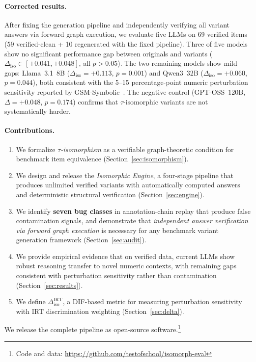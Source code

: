 \paragraph{Corrected results.}
After fixing the generation pipeline and independently verifying all
variant answers via forward graph execution, we evaluate five LLMs on
69 verified items (59 verified-clean + 10 regenerated with the fixed
pipeline). Three of five models show no significant performance gap
between originals and variants
($\Delta_{\mathrm{iso}} \in [+0.041, +0.048]$, all $p > 0.05$).
The two remaining models show mild gaps: Llama~3.1~8B
($\Delta_{\mathrm{iso}} = +0.113$, $p = 0.001$) and Qwen3~32B
($\Delta_{\mathrm{iso}} = +0.060$, $p = 0.044$), both consistent
with the 5--15 percentage-point numeric perturbation sensitivity
reported by GSM-Symbolic~\cite{mirzadeh2024gsmsymbolic}. The
negative control (GPT-OSS~120B,
$\Delta = +0.048$, $p = 0.174$) confirms that $\tau$-isomorphic
variants are not systematically harder.

\paragraph{Contributions.}
\begin{enumerate}[leftmargin=*, nosep]
\item We formalize \emph{$\tau$-isomorphism} as a verifiable
graph-theoretic condition for benchmark item equivalence
(Section~\ref{sec:isomorphism}).

\item We design and release the \emph{Isomorphic Engine}, a
four-stage pipeline that produces unlimited verified variants with
automatically computed answers and deterministic structural
verification (Section~\ref{sec:engine}).

\item We identify \textbf{seven bug classes} in annotation-chain
replay that produce false contamination signals, and demonstrate that
\emph{independent answer verification via forward graph execution} is
necessary for any benchmark variant generation framework
(Section~\ref{sec:audit}).

\item We provide empirical evidence that on verified data, current
LLMs show robust reasoning transfer to novel numeric contexts, with
remaining gaps consistent with perturbation sensitivity rather than
contamination (Section~\ref{sec:results}).

\item We define $\Delta_{\mathrm{iso}}^{\mathrm{IRT}}$, a
DIF-based metric for measuring perturbation sensitivity with IRT
discrimination weighting (Section~\ref{sec:delta}).
\end{enumerate}

\noindent We release the complete pipeline as open-source
software.\footnote{Code and data:
\url{https://github.com/testofschool/isomorph-eval}}
